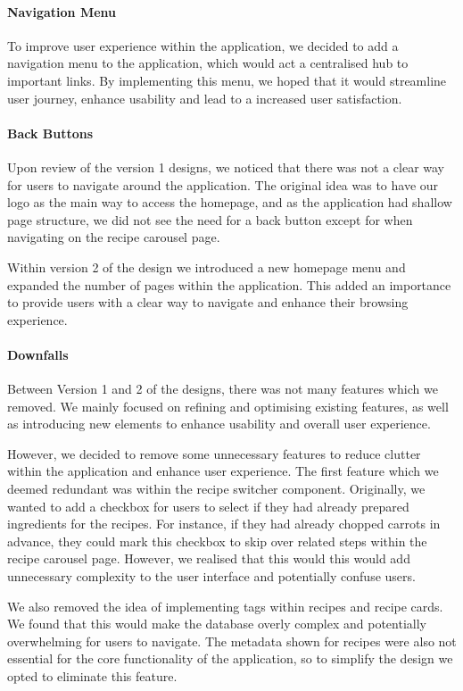\documentclass{article}
\begin{document}
\paragraph{Navigation Menu}
To improve user experience within the application, we decided to add a
navigation menu to the application, which would act a centralised hub to
important links. By implementing this menu, we hoped that it would streamline
user journey, enhance usability and lead to a increased user satisfaction.

\paragraph{Back Buttons}
Upon review of the version 1 designs, we noticed that there was not a clear way
for users to navigate around the application. The original idea was to have our
logo as the main way to access the homepage, and as the application had shallow
page structure, we did not see the need for a back button except for when
navigating on the recipe carousel page.

Within version 2 of the design we introduced a new homepage menu and expanded
the number of pages within the application. This added an importance to provide
users with a clear way to navigate and enhance their browsing experience.

\paragraph{Downfalls}
Between Version 1 and 2 of the designs, there was not many features which we
removed. We mainly focused on refining and optimising existing features, as
well as introducing new elements to enhance usability and overall user
experience.

However, we decided to remove some unnecessary features to reduce clutter
within the application and enhance user experience. The first feature which we
deemed redundant was within the recipe switcher component. Originally, we
wanted to add a checkbox for users to select if they had already prepared
ingredients for the recipes. For instance, if they had already chopped carrots
in advance, they could mark this checkbox to skip over related steps within the
recipe carousel page. However, we realised that this would this would add
unnecessary complexity to the user interface and potentially confuse users.

We also removed the idea of implementing tags within recipes and recipe cards.
We found that this would make the database overly complex and potentially
overwhelming for users to navigate. The metadata shown for recipes were also
not essential for the core functionality of the application, so to simplify the
design we opted to eliminate this feature.
\end{document}

